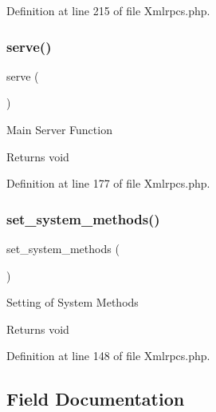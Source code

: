 Definition at line 215 of file Xmlrpcs.\+php.

\mbox{\label{class_c_i___xmlrpcs_aa9e0b443b9575f62bf9f8e85b1742c96}} 
\subsubsection{\texorpdfstring{serve()}{serve()}}
{\footnotesize\ttfamily serve (\begin{DoxyParamCaption}{ }\end{DoxyParamCaption})}

Main Server Function

\begin{DoxyReturn}{Returns}
void 
\end{DoxyReturn}


Definition at line 177 of file Xmlrpcs.\+php.

\mbox{\label{class_c_i___xmlrpcs_a858a05529612358b8f63c88b08b414d0}} 
\subsubsection{\texorpdfstring{set\_system\_methods()}{set\_system\_methods()}}
{\footnotesize\ttfamily set\+\_\+system\+\_\+methods (\begin{DoxyParamCaption}{ }\end{DoxyParamCaption})}

Setting of System Methods

\begin{DoxyReturn}{Returns}
void 
\end{DoxyReturn}


Definition at line 148 of file Xmlrpcs.\+php.



\subsection{Field Documentation}
\mbox{\label{class_c_i___xmlrpcs_afed2f9c39f2e406bcdff222ce412bda8}} 
